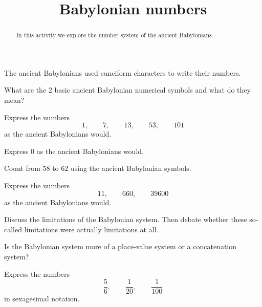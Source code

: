 \documentclass{ximera}
\title{Babylonian numbers}
\begin{document}
\begin{abstract}In this activity we explore the number system of the ancient
  Babylonians.
\end{abstract} 
\maketitle


The ancient Babylonians used cuneiform characters to write their
numbers.

\begin{exercise}
What are the 2 basic ancient Babylonian numerical symbols and what do
they mean?
\end{exercise}


\begin{exercise}
Express the numbers 
\[
1, \qquad 7,\qquad 13,\qquad 53,\qquad 101 
\]
as the ancient Babylonians would. 
\end{exercise}


\begin{question}
Express 0 as the ancient Babylonians would. 
\end{question}


\begin{question}
Count from 58 to 62 using the ancient Babylonian symbols. 
\end{question}



\begin{exploration}
Express the numbers 
\[
11,\qquad 660,\qquad 39600 
\]
as the ancient Babylonians would. 
\end{exploration}


\begin{exploration}
Discuss the limitations of the Babylonian system. Then debate whether
these so-called limitations were actually limitations at all.
\end{exploration}

\begin{exploration}
Is the Babylonian system more of a place-value system or a
concatenation system?
\end{exploration}



\begin{question}%
Express the numbers 
\[
\frac{5}{6}, \qquad \frac{1}{20},\qquad \frac{1}{100}
\]
in sexagesimal notation.
\end{question}
\end{document}
